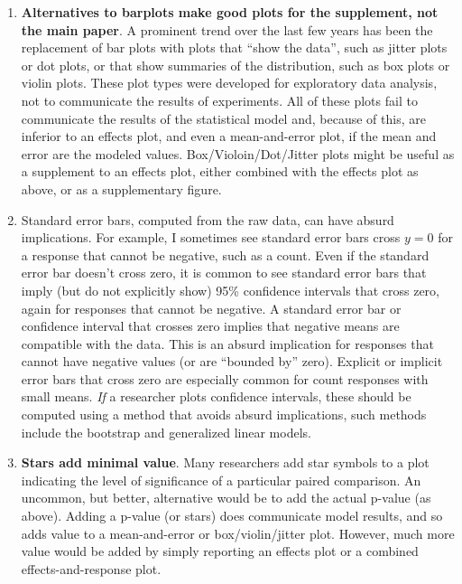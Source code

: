 \documentclass[]{book}
\providecommand{\tightlist}{%
  \setlength{\itemsep}{0pt}\setlength{\parskip}{0pt}}
\begin{document}
\begin{enumerate}
\def\labelenumi{\arabic{enumi}.}
\tightlist
\item
  \textbf{Alternatives to barplots make good plots for the supplement,
  not the main paper}. A prominent trend over the last few years has
  been the replacement of bar plots with plots that ``show the data'',
  such as jitter plots or dot plots, or that show summaries of the
  distribution, such as box plots or violin plots. These plot types were
  developed for exploratory data analysis, not to communicate the
  results of experiments. All of these plots fail to communicate the
  results of the statistical model and, because of this, are inferior to
  an effects plot, and even a mean-and-error plot, if the mean and error
  are the modeled values. Box/Violoin/Dot/Jitter plots might be useful
  as a supplement to an effects plot, either combined with the effects
  plot as above, or as a supplementary figure.
\item
  Standard error bars, computed from the raw data, can have absurd
  implications. For example, I sometimes see standard error bars cross
  \(y=0\) for a response that cannot be negative, such as a count. Even
  if the standard error bar doesn't cross zero, it is common to see
  standard error bars that imply (but do not explicitly show) 95\%
  confidence intervals that cross zero, again for responses that cannot
  be negative. A standard error bar or confidence interval that crosses
  zero implies that negative means are compatible with the data. This is
  an absurd implication for responses that cannot have negative values
  (or are ``bounded by'' zero). Explicit or implicit error bars that
  cross zero are especially common for count responses with small means.
  \emph{If} a researcher plots confidence intervals, these should be
  computed using a method that avoids absurd implications, such methods
  include the bootstrap and generalized linear models.
\item
  \textbf{Stars add minimal value}. Many researchers add star symbols to
  a plot indicating the level of significance of a particular paired
  comparison. An uncommon, but better, alternative would be to add the
  actual p-value (as above). Adding a p-value (or stars) does
  communicate model results, and so adds value to a mean-and-error or
  box/violin/jitter plot. However, much more value would be added by
  simply reporting an effects plot or a combined effects-and-response
  plot.
\end{enumerate}
\end{document}
